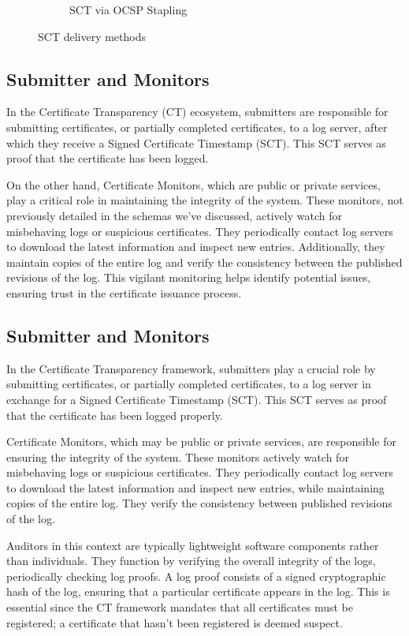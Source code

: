 \begin{figure}[H]
\begin{subfigure}[b]{0.3\textwidth}
    \caption{SCT via OCSP Stapling}
    \label{fig:ct ocsp}
  \end{subfigure}
  \caption{SCT delivery methods}
  \label{fig:ct delivery}
\end{figure}

\subsection{Submitter and Monitors}

In the Certificate Transparency (CT) ecosystem, submitters are
responsible for submitting certificates, or partially completed
certificates, to a log server, after which they receive a Signed
Certificate Timestamp (SCT). This SCT serves as proof that the
certificate has been logged. 

On the other hand, Certificate Monitors, which are public or private
services, play a critical role in maintaining the integrity of the
system. These monitors, not previously detailed in the schemas we've
discussed, actively watch for misbehaving logs or suspicious
certificates. They periodically contact log servers to download the
latest information and inspect new entries. Additionally, they
maintain copies of the entire log and verify the consistency between
the published revisions of the log. This vigilant monitoring helps
identify potential issues, ensuring trust in the certificate issuance
process.

\subsection{ Submitter and Monitors}

In the Certificate Transparency framework, submitters play a crucial
role by submitting certificates, or partially completed certificates,
to a log server in exchange for a Signed Certificate Timestamp (SCT).
This SCT serves as proof that the certificate has been logged
properly.

Certificate Monitors, which may be public or private services, are
responsible for ensuring the integrity of the system. These monitors
actively watch for misbehaving logs or suspicious certificates. They
periodically contact log servers to download the latest information
and inspect new entries, while maintaining copies of the entire log.
They verify the consistency between published revisions of the log.

Auditors in this context are typically lightweight software components
rather than individuals. They function by verifying the overall
integrity of the logs, periodically checking log proofs. A log proof
consists of a signed cryptographic hash of the log, ensuring that a
particular certificate appears in the log. This is essential since the
CT framework mandates that all certificates must be registered; a
certificate that hasn't been registered is deemed suspect. 


